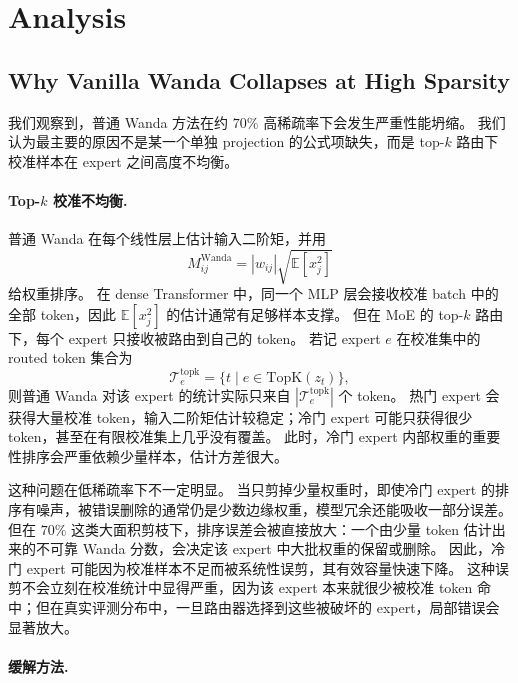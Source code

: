 \documentclass[letterpaper]{article}
\begin{document}
\section{Analysis}

\subsection{Why Vanilla Wanda Collapses at High Sparsity}

我们观察到，普通 Wanda 方法在约 $70\%$ 高稀疏率下会发生严重性能坍缩。
我们认为最主要的原因不是某一个单独 projection 的公式项缺失，而是 top-$k$ 路由下校准样本在 expert 之间高度不均衡。

\paragraph{Top-$k$ 校准不均衡.}

普通 Wanda 在每个线性层上估计输入二阶矩，并用
\begin{equation}
    M_{ij}^{\mathrm{Wanda}}
    =
    |w_{ij}|\sqrt{\mathbb{E}[x_j^2]}
\end{equation}
给权重排序。
在 dense Transformer 中，同一个 MLP 层会接收校准 batch 中的全部 token，因此 $\mathbb{E}[x_j^2]$ 的估计通常有足够样本支撑。
但在 MoE 的 top-$k$ 路由下，每个 expert 只接收被路由到自己的 token。
若记 expert $e$ 在校准集中的 routed token 集合为
\begin{equation}
    \mathcal{T}^{\mathrm{topk}}_e
    =
    \{t\mid e\in\mathrm{TopK}(z_t)\},
\end{equation}
则普通 Wanda 对该 expert 的统计实际只来自 $|\mathcal{T}^{\mathrm{topk}}_e|$ 个 token。
热门 expert 会获得大量校准 token，输入二阶矩估计较稳定；冷门 expert 可能只获得很少 token，甚至在有限校准集上几乎没有覆盖。
此时，冷门 expert 内部权重的重要性排序会严重依赖少量样本，估计方差很大。

这种问题在低稀疏率下不一定明显。
当只剪掉少量权重时，即使冷门 expert 的排序有噪声，被错误删除的通常仍是少数边缘权重，模型冗余还能吸收一部分误差。
但在 $70\%$ 这类大面积剪枝下，排序误差会被直接放大：一个由少量 token 估计出来的不可靠 Wanda 分数，会决定该 expert 中大批权重的保留或删除。
因此，冷门 expert 可能因为校准样本不足而被系统性误剪，其有效容量快速下降。
这种误剪不会立刻在校准统计中显得严重，因为该 expert 本来就很少被校准 token 命中；但在真实评测分布中，一旦路由器选择到这些被破坏的 expert，局部错误会显著放大。

\paragraph{缓解方法.}
\end{document}
